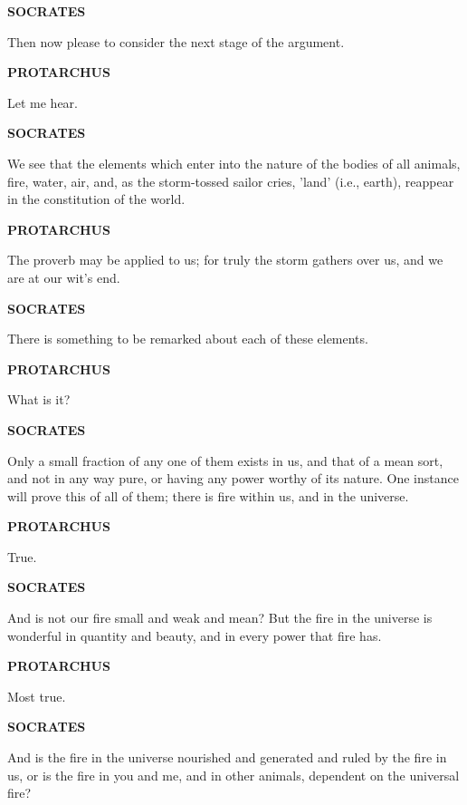 \documentclass[11pt,letter]{article}
\begin{document}
\par \textbf{SOCRATES}
\par   Then now please to consider the next stage of the argument.

\par \textbf{PROTARCHUS}
\par   Let me hear.

\par \textbf{SOCRATES}
\par   We see that the elements which enter into the nature of the bodies of all animals, fire, water, air, and, as the storm-tossed sailor cries, 'land' (i.e., earth), reappear in the constitution of the world.

\par \textbf{PROTARCHUS}
\par   The proverb may be applied to us; for truly the storm gathers over us, and we are at our wit's end.

\par \textbf{SOCRATES}
\par   There is something to be remarked about each of these elements.

\par \textbf{PROTARCHUS}
\par   What is it?

\par \textbf{SOCRATES}
\par   Only a small fraction of any one of them exists in us, and that of a mean sort, and not in any way pure, or having any power worthy of its nature. One instance will prove this of all of them; there is fire within us, and in the universe.

\par \textbf{PROTARCHUS}
\par   True.

\par \textbf{SOCRATES}
\par   And is not our fire small and weak and mean? But the fire in the universe is wonderful in quantity and beauty, and in every power that fire has.

\par \textbf{PROTARCHUS}
\par   Most true.

\par \textbf{SOCRATES}
\par   And is the fire in the universe nourished and generated and ruled by the fire in us, or is the fire in you and me, and in other animals, dependent on the universal fire?
\end{document}
